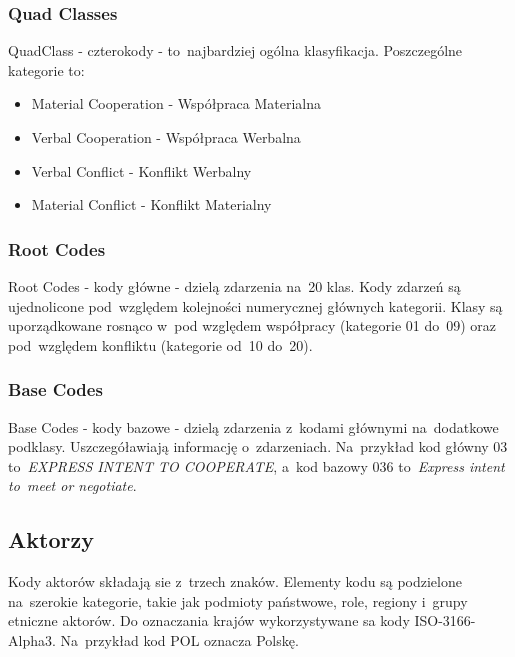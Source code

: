 \documentclass[11pt]{report}
\begin{document}
    \subsubsection{Quad Classes}
    QuadClass - czterokody - to~najbardziej ogólna klasyfikacja.
    Poszczególne kategorie to:
    \begin{itemize}
        \item Material Cooperation - Współpraca Materialna
        \item Verbal Cooperation - Współpraca Werbalna
        \item Verbal Conflict - Konflikt Werbalny
        \item Material Conflict - Konflikt Materialny
    \end{itemize}

    \subsubsection{Root Codes}
    Root Codes - kody główne - dzielą zdarzenia na~20 klas.
    Kody zdarzeń są ujednolicone pod~względem kolejności numerycznej głównych kategorii.
    Klasy są uporządkowane rosnąco w~pod względem współpracy (kategorie 01 do~09) oraz pod~względem konfliktu
    (kategorie od~10 do~20).

    \subsubsection{Base Codes}
    Base Codes - kody bazowe - dzielą zdarzenia z~kodami głównymi na~dodatkowe podklasy.
    Uszczegóławiają informację o~zdarzeniach.
    Na~przykład kod główny 03 to~\textit{EXPRESS INTENT TO COOPERATE},
    a~kod bazowy 036 to~\textit{Express intent to~meet or negotiate}.

    \subsection{Aktorzy}
    Kody aktorów składają sie z~trzech znaków.
    Elementy kodu są podzielone na~szerokie kategorie, takie jak podmioty państwowe, role, regiony i~grupy etniczne aktorów.
    Do oznaczania krajów wykorzystywane sa kody ISO-3166-Alpha3.
    Na~przykład kod POL oznacza Polskę.
\end{document}
